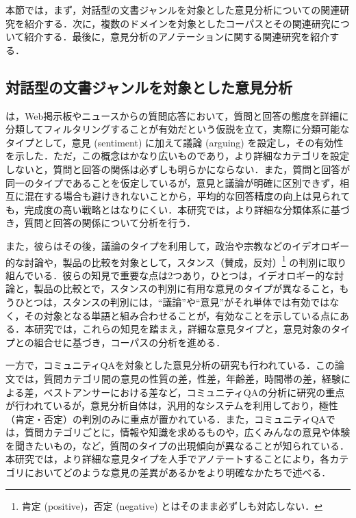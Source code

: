 \documentclass[japanese]{jnlp_1.4}
\begin{document}
本節では，まず，対話型の文書ジャンルを対象とした意見分析についての関連研究を紹介する．次に，複数のドメインを対象としたコーパスとその関連研究について紹介する．最後に，意見分析のアノテーションに関する関連研究を紹介する．


\subsection{対話型の文書ジャンルを対象とした意見分析}
\label{subsec:dialogue}

は，Web掲示板やニュースからの質問応答において，質問と回答の態度を詳細に分類してフィルタリングすることが有効だという仮説を立て，実際に分類可能なタイプとして，意見 (sentiment) に加えて議論 (arguing) を設定し，その有効性を示した．ただ，この概念はかなり広いものであり，より詳細なカテゴリを設定しないと，質問と回答の関係は必ずしも明らかにならない．また，質問と回答が同一のタイプであることを仮定しているが，意見と議論が明確に区別できず，相互に混在する場合も避けきれないことから，平均的な回答精度の向上は見られても，完成度の高い戦略とはなりにくい．本研究では，より詳細な分類体系に基づき，質問と回答の関係について分析を行う．

また，彼らはその後，議論のタイプを利用して，政治や宗教などのイデオロギー的な討論\cite{soma2010naacl}や，製品の比較\cite{soma2009acl}を対象として，スタンス（賛成，反対）\footnote{肯定 (positive)，否定 (negative) とはそのまま必ずしも対応しない．} の判別に取り組んでいる．彼らの知見で重要な点は2つあり，ひとつは，イデオロギー的な討論と，製品の比較とで，スタンスの判別に有用な意見のタイプが異なること，もうひとつは，スタンスの判別には，``議論''や``意見''がそれ単体では有効ではなく，その対象となる単語と組み合わせることが，有効なことを示している点にある．本研究では，これらの知見を踏まえ，詳細な意見タイプと，意見対象のタイプとの組合せに基づき，コーパスの分析を進める．

一方で，コミュニティQAを対象とした意見分析の研究も行われている\cite{kucu2012wsdm}．この論文では，質問カテゴリ間の意見の性質の差，性差，年齢差，時間帯の差，経験による差，ベストアンサーにおける差など，コミュニティQAの分析に研究の重点が行われているが，意見分析自体は，汎用的なシステムを利用しており，極性（肯定・否定）の判別のみに重点が置かれている．また，コミュニティQAでは，質問カテゴリごとに，情報や知識を求めるものや，広くみんなの意見や体験を聞きたいもの，など，質問のタイプの出現傾向が異なることが知られている\cite{kuriyama2009fi}．本研究では，より詳細な意見タイプを人手でアノテートすることにより，各カテゴリにおいてどのような意見の差異があるかをより明確なかたちで述べる．
\end{document}
